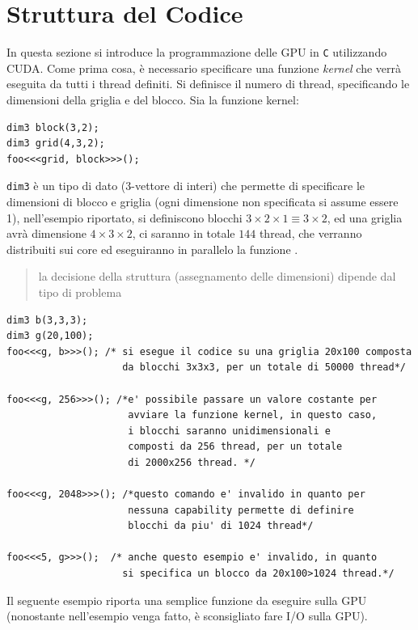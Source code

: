 \documentclass[10pt, letterpaper]{report}
\begin{document}
\section{Struttura del Codice}
In questa sezione si introduce la programmazione delle GPU in \texttt{C} utilizzando CUDA. Come prima cosa, è necessario specificare una funzione \textit{kernel} che verrà eseguita da tutti i thread definiti. Si definisce il numero di thread, specificando le dimensioni della griglia e del blocco.\acc 
Sia  la funzione kernel:
\begin{lstlisting}[style=CStyle]
dim3 block(3,2);
dim3 grid(4,3,2);
foo<<<grid, block>>>();
\end{lstlisting}
\texttt{dim3} è un tipo di dato (3-vettore di interi) che permette di specificare le dimensioni di blocco e griglia (ogni dimensione non specificata si assume essere 1), nell'esempio riportato, si definiscono blocchi $3\times 2 \times 1 \equiv 3\times 2$, ed una griglia avrà dimensione $4\times 3 \times 2$, ci saranno in totale $144$ thread, che verranno distribuiti sui core ed eseguiranno in parallelo la funzione .\begin{quote}
    la decisione della struttura (assegnamento delle dimensioni) dipende dal tipo di problema
\end{quote}
\begin{lstlisting}[style=CStyle]
dim3 b(3,3,3);
dim3 g(20,100);
foo<<<g, b>>>(); /* si esegue il codice su una griglia 20x100 composta 
                    da blocchi 3x3x3, per un totale di 50000 thread*/

foo<<<g, 256>>>(); /*e' possibile passare un valore costante per 
                     avviare la funzione kernel, in questo caso, 
                     i blocchi saranno unidimensionali e 
                     composti da 256 thread, per un totale  
                     di 2000x256 thread. */

foo<<<g, 2048>>>(); /*questo comando e' invalido in quanto per 
                     nessuna capability permette di definire 
                     blocchi da piu' di 1024 thread*/

foo<<<5, g>>>();  /* anche questo esempio e' invalido, in quanto 
                    si specifica un blocco da 20x100>1024 thread.*/
\end{lstlisting}
Il seguente esempio riporta una semplice funzione da eseguire sulla GPU (nonostante nell'esempio venga fatto, è sconsigliato fare I/O sulla GPU).
\end{document}

